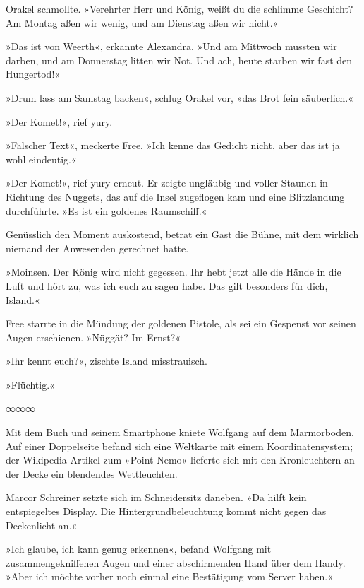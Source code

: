 Orakel schmollte. »Verehrter Herr und König, weißt du die schlimme Geschicht? Am Montag aßen wir wenig, und am Dienstag aßen wir nicht.«

»Das ist von Weerth«, erkannte Alexandra. »Und am Mittwoch mussten wir darben, und am Donnerstag litten wir Not. Und ach, heute starben wir fast den Hungertod!«

»Drum lass am Samstag backen«, schlug Orakel vor, »das Brot fein säuberlich.«

»Der Komet!«, rief yury.

»Falscher Text«, meckerte Free. »Ich kenne das Gedicht nicht, aber das ist ja wohl eindeutig.«

»Der Komet!«, rief yury erneut. Er zeigte ungläubig und voller Staunen in Richtung des Nuggets, das auf die Insel zugeflogen kam und eine Blitzlandung durchführte. »Es ist ein goldenes Raumschiff.«

Genüsslich den Moment auskostend, betrat ein Gast die Bühne, mit dem wirklich niemand der Anwesenden gerechnet hatte.

»Moinsen. Der König wird nicht gegessen. Ihr hebt jetzt alle die Hände in die Luft und hört zu, was ich euch zu sagen habe. Das gilt besonders für dich, Island.«

Free starrte in die Mündung der goldenen Pistole, als sei ein Gespenst vor seinen Augen erschienen. »Nüggät? Im Ernst?«

»Ihr kennt euch?«, zischte Island misstrauisch.

»Flüchtig.«

\begin{center}
∞∞∞
\end{center}

Mit dem Buch und seinem Smartphone kniete Wolfgang auf dem Marmorboden. Auf einer Doppelseite befand sich eine Weltkarte mit einem Koordinatensystem; der Wikipedia-Artikel zum »Point Nemo« lieferte sich mit den Kronleuchtern an der Decke ein blendendes Wettleuchten.

Marcor Schreiner setzte sich im Schneidersitz daneben. »Da hilft kein entspiegeltes Display. Die Hintergrundbeleuchtung kommt nicht gegen das Deckenlicht an.«

»Ich glaube, ich kann genug erkennen«, befand Wolfgang mit zusammengekniffenen Augen und einer abschirmenden Hand über dem Handy. »Aber ich möchte vorher noch einmal eine Bestätigung vom Server haben.«

